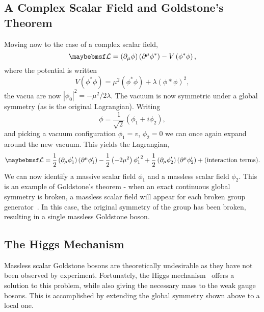 \subsection{A Complex Scalar Field and Goldstone's Theorem}
\label{sec:sm_goldstone}
Moving now to the case of a complex scalar field,
\begin{equation*}
\lagrangiand = \left(\partial_{\mu}\phi\right)\left(\partial^{\mu}\phi^*\right)
- V\left(\phi^*\phi\right),
\end{equation*}
where the potential is written
\begin{equation*}
V\left(\phi^*\phi\right) = \mu^2\left(\phi^*\phi\right) +
\lambda\left(\phi*\phi\right)^2,
\end{equation*}
the vacua are now $\left|\phi_0\right|^2 = -\mu^2/2\lambda$. The vacuum is now
symmetric under a global \Uone symmetry (as is the original Lagrangian). Writing
\begin{equation*}
\phi = \frac{1}{\sqrt{2}}\left(\phi_1 + i\phi_2\right),
\end{equation*}
and picking a vacuum configuration $\phi_1 = v$, $\phi_2 = 0$ we can once again
expand around the new vacuum. This yields the Lagrangian,
\begin{equation*}
  \lagrangiand =
  \frac{1}{2}\left(\partial_{\mu}\phi'_1\right)\left(\partial^{\mu}\phi'_1\right)
  -\frac{1}{2}\left(-2\mu^2\right){\phi'_1}^2 +
  \frac{1}{2}\left(\partial_{\mu}\phi'_2\right)\left(\partial^{\mu}\phi'_2\right)
  + \textrm{(interaction terms)}.
\end{equation*}
We can now identify a massive scalar field $\phi_1$ and a massless scalar field
$\phi_2$. This is an example of Goldstone's theorem - when an exact continuous
global symmetry is broken, a massless scalar field will appear for each broken
group generator~\cite{nambu, goldstone}. In this case, the original \Uone
symmetry of the group has been broken, resulting in a single massless Goldstone
boson.

\subsection{The Higgs Mechanism}\label{sec:sm_higgs}
Massless scalar Goldstone bosons are theoretically undesirable as they have not
been observed by experiment. Fortunately, the Higgs mechanism~\cite{higgs}
offers a solution to this problem, while also giving the necessary mass to the
weak gauge bosons. This is accomplished by extending the global symmetry shown
above to a local one.


